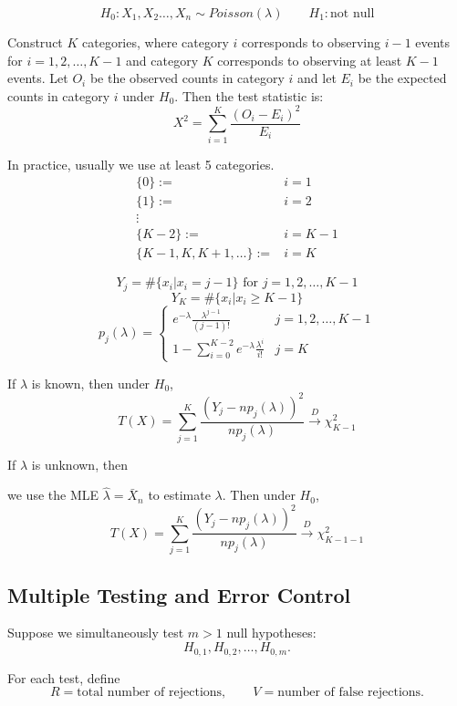 \begin{eb}[Poisson]
\[
H_0: X_1,X_2\dots,X_n \sim Poisson(\lambda) \qquad H_1: \text{not null}
\]

Construct $K$ categories, where category $i$ corresponds to observing $i-1$ events for $i=1,2,\dots,K-1$ and category $K$ corresponds to observing at least $K-1$ events. Let $O_i$ be the observed counts in category $i$ and let $E_i$ be the expected counts in category $i$ under $H_0$. Then the test statistic is:
\[
X^2 = \sum_{i=1}^K \frac{(O_i - E_i)^2}{E_i}
\]

In practice, usually we use at least 5 categories.
\begin{align*}
\{0\} :=&  i = 1\\
\{1\} :=&  i = 2\\
\vdots & \\
\{K-2\} :=&  i = K-1\\
\{K-1, K, K+1, \dots \} :=&  i = K
\end{align*}

\[
Y_j = \#\{x_i | x_i = j-1\} \text{ for } j = 1,2,\dots,K-1
\]
\[
Y_K = \#\{x_i | x_i \ge K-1\}
\]
\[
p_j(\lambda) = \begin{cases}
    e^{-\lambda} \frac{\lambda^{j-1}}{(j-1)!} & j = 1,2,\dots,K-1\\
    1 - \sum_{i=0}^{K-2} e^{-\lambda} \frac{\lambda^i}{i!} & j = K
\end{cases} 
\]

If $\lambda$ is known, then under $H_0$,
\[
T(X) = \sum\limits_{j=1}^{K} \dfrac{(Y_j - n p_j(\lambda))^2}{np_j(\lambda)} \overset{D}{\rightarrow} \chi^2_{K-1} 
\]

If $\lambda$ is unknown, then

we use the MLE $\hat \lambda = \bar X_n$ to estimate $\lambda$. Then under $H_0$,
\[
T(X) = \sum\limits_{j=1}^{K} \dfrac{(Y_j - n p_j(\lambda))^2}{np_j(\lambda)} \overset{D}{\rightarrow} \chi^2_{K-1-1} 
\]


\end{eb}

\subsection{Multiple Testing and Error Control}

Suppose we simultaneously test $m > 1$ null hypotheses:
\[
H_{0,1}, H_{0,2}, \dots, H_{0,m}.
\]

For each test, define
\[
R = \text{total number of rejections}, 
\qquad
V = \text{number of false rejections}.
\]

